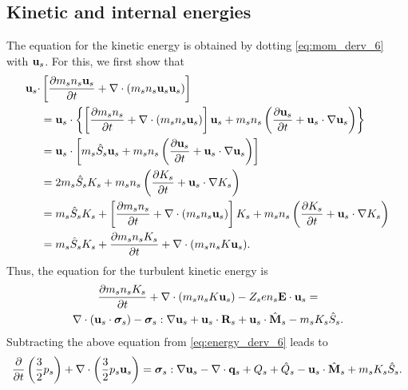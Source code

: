 \documentclass[a4paper,11pt]{report}
\begin{document}
\subsection{Kinetic and internal energies}
The equation for the kinetic energy is obtained by dotting \cref{eq:mom_derv_6} with $\mathbf{u}_s$. For this, we first show that
\begin{align}
    \mathbf{u}_s \cdot &\left [ \frac{\partial m_s n_s \mathbf{u}_s}{\partial t} + \nabla \cdot \left ( m_s n_s \mathbf{u}_s \mathbf{u}_s \right) \right ] \\
    & =\mathbf{u}_s \cdot \left \{ \left [ \frac{\partial m_s n_s }{\partial t} + \nabla \cdot \left ( m_s n_s \mathbf{u}_s \right) \right] \mathbf{u}_s  + m_s n_s \left ( \frac{\partial \mathbf{u}_s}{\partial t} + \mathbf{u}_s \cdot \nabla \mathbf{u}_s \right ) \right \}\\
    & =\mathbf{u}_s \cdot \left [ m_s \hat{S}_s \mathbf{u}_s  + m_s n_s \left ( \frac{\partial \mathbf{u}_s}{\partial t} + \mathbf{u}_s \cdot \nabla \mathbf{u}_s \right ) \right ] \\
    & =2m_s \hat{S}_s K_s + m_s n_s \left ( \frac{\partial K_s}{\partial t} + \mathbf{u}_s \cdot \nabla K_s \right) \\
    & =m_s \hat{S}_s K_s + \left [ \frac{\partial m_s n_s}{\partial t} + \nabla \cdot \left (m_s n_s \mathbf{u}_s \right ) \right] K_s + m_s n_s \left ( \frac{\partial K_s}{\partial t} + \mathbf{u}_s \cdot \nabla K_s \right) \\
    & =m_s \hat{S}_s K_s + \frac{\partial m_s n_s K_s}{\partial t} + \nabla \cdot ( m_s n_s K \mathbf{u}_s ).
\end{align}
Thus, the equation for the turbulent kinetic energy is
\begin{multline}
\frac{\partial m_s n_s K_s}{\partial t} + \nabla \cdot ( m_s n_s K \mathbf{u}_s ) - Z_s e n_s \mathbf{E} \cdot \mathbf{u}_s =\\
\nabla \cdot (\mathbf{u}_s \cdot \bm \sigma_s ) - \bm \sigma_s : \nabla \mathbf{u}_s + \mathbf{u}_s \cdot \mathbf{R}_s + \mathbf{u}_s \cdot \hat{\mathbf{M}}_s - m_s K_s \hat{S}_s .
\end{multline}
Subtracting the above equation from \cref{eq:energy_derv_6} leads to 
\begin{equation}
\frac{\partial}{\partial t} \left ( \frac{3}{2} p_s \right ) + \nabla \cdot \left ( \frac{3}{2} p_s \mathbf{u}_s \right ) = \bm \sigma_s : \nabla \mathbf{u}_s - \nabla \cdot \mathbf{q}_s + Q_{s} + \hat{Q}_s - \mathbf{u}_s \cdot \hat{\mathbf{M}}_s + m_s K_s \hat{S}_s .
\end{equation}
\end{document}
